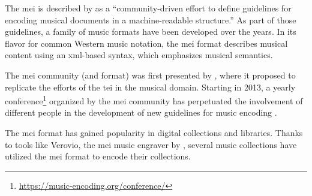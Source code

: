 

The \gls{mei} is described by \textcite{hankinson2011music}
as a ``community-driven effort to define guidelines for
encoding musical documents in a machine-readable
structure.'' As part of those guidelines, a family of music
formats have been developed over the years. In its flavor
for common Western music notation, the \gls{mei} format
describes musical content using an \gls{xml}-based syntax,
which emphasizes musical semantics.


The \gls{mei} community (and format) was first presented by
\textcite{roland2002music}, where it proposed to replicate
the efforts of the \gls{tei} in the musical domain. Starting
in 2013, a yearly
conference\footnote{\href{https://music-encoding.org/conference/}{https://music-encoding.org/conference/}}
organized by the \gls{mei} community has perpetuated the
involvement of different people in the development of new
guidelines for music encoding
\parencite{crawford2016review}.


The \gls{mei} format has gained popularity in digital
collections and libraries. Thanks to tools like Verovio, the
\gls{mei} music engraver by \textcite{pugin2014verovio},
several music collections have utilized the \gls{mei} format
to encode their collections.

